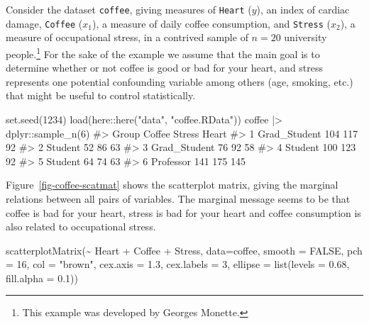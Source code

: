 \documentclass[
  letterpaper,
  10pt,
  krantz2]{krantz}
\makeatletter
\newenvironment{Shaded}{\begin{snugshade}}{\end{snugshade}}
\newcommand{\AttributeTok}[1]{\textcolor[rgb]{0.40,0.45,0.13}{#1}}
\newcommand{\CommentTok}[1]{\textcolor[rgb]{0.37,0.37,0.37}{#1}}
\newcommand{\ConstantTok}[1]{\textcolor[rgb]{0.56,0.35,0.01}{#1}}
\newcommand{\DecValTok}[1]{\textcolor[rgb]{0.68,0.00,0.00}{#1}}
\newcommand{\FloatTok}[1]{\textcolor[rgb]{0.68,0.00,0.00}{#1}}
\newcommand{\FunctionTok}[1]{\textcolor[rgb]{0.28,0.35,0.67}{#1}}
\newcommand{\NormalTok}[1]{\textcolor[rgb]{0.00,0.23,0.31}{#1}}
\newcommand{\SpecialCharTok}[1]{\textcolor[rgb]{0.37,0.37,0.37}{#1}}
\newcommand{\StringTok}[1]{\textcolor[rgb]{0.13,0.47,0.30}{#1}}
\newenvironment{kframe}{%
  \medskip{}
  \setlength{\fboxsep}{.8em}
  \def\at@end@of@kframe{}%
  \ifinner\ifhmode%
  \def\at@end@of@kframe{\end{minipage}}%
  \begin{minipage}{\columnwidth}%
  \fi\fi%
  \def\FrameCommand##1{\hskip\@totalleftmargin \hskip-\fboxsep
  \colorbox{shadecolor}{##1}\hskip-\fboxsep
      \hskip-\linewidth \hskip-\@totalleftmargin \hskip\columnwidth}%
  \MakeFramed {\advance\hsize-\width
    \@totalleftmargin\z@ \linewidth\hsize
    \@setminipage}}%
{\par\unskip\endMakeFramed%
  \at@end@of@kframe}
\renewenvironment{Shaded}{\begin{kframe}}{\end{kframe}}
\makeatother
\begin{document}
Consider the dataset \texttt{coffee}, giving measures of \texttt{Heart}
(\(y\)), an index of cardiac damage, \texttt{Coffee} (\(x_1\)), a
measure of daily coffee consumption, and \texttt{Stress} (\(x_2\)), a
measure of occupational stress, in a contrived sample of \(n=20\)
university people.\footnote{This example was developed by Georges
  Monette.} For the sake of the example we assume that the main goal is
to determine whether or not coffee is good or bad for your heart, and
stress represents one potential confounding variable among others (age,
smoking, etc.) that might be useful to control statistically.

\begin{Shaded}
\begin{Highlighting}[]
\FunctionTok{set.seed}\NormalTok{(}\DecValTok{1234}\NormalTok{)}
\FunctionTok{load}\NormalTok{(here}\SpecialCharTok{::}\FunctionTok{here}\NormalTok{(}\StringTok{"data"}\NormalTok{, }\StringTok{"coffee.RData"}\NormalTok{))}
\NormalTok{coffee }\SpecialCharTok{|\textgreater{}}\NormalTok{ dplyr}\SpecialCharTok{::}\FunctionTok{sample\_n}\NormalTok{(}\DecValTok{6}\NormalTok{)}
\CommentTok{\#\textgreater{}          Group Coffee Stress Heart}
\CommentTok{\#\textgreater{} 1 Grad\_Student    104    117    92}
\CommentTok{\#\textgreater{} 2      Student     52     86    63}
\CommentTok{\#\textgreater{} 3 Grad\_Student     76     92    58}
\CommentTok{\#\textgreater{} 4      Student    100    123    92}
\CommentTok{\#\textgreater{} 5      Student     64     74    63}
\CommentTok{\#\textgreater{} 6    Professor    141    175   145}
\end{Highlighting}
\end{Shaded}

Figure~\ref{fig-coffee-scatmat} shows the scatterplot matrix, giving the
marginal relations between all pairs of variables. The marginal message
seems to be that coffee is bad for your heart, stress is bad for your
heart and coffee consumption is also related to occupational stress.

\begin{Shaded}
\begin{Highlighting}[]
\FunctionTok{scatterplotMatrix}\NormalTok{(}\SpecialCharTok{\textasciitilde{}}\NormalTok{ Heart }\SpecialCharTok{+}\NormalTok{ Coffee }\SpecialCharTok{+}\NormalTok{ Stress, }\AttributeTok{data=}\NormalTok{coffee,}
    \AttributeTok{smooth =} \ConstantTok{FALSE}\NormalTok{,}
    \AttributeTok{pch =} \DecValTok{16}\NormalTok{, }\AttributeTok{col =} \StringTok{"brown"}\NormalTok{,}
    \AttributeTok{cex.axis =} \FloatTok{1.3}\NormalTok{, }\AttributeTok{cex.labels =} \DecValTok{3}\NormalTok{,}
    \AttributeTok{ellipse =} \FunctionTok{list}\NormalTok{(}\AttributeTok{levels =} \FloatTok{0.68}\NormalTok{, }\AttributeTok{fill.alpha =} \FloatTok{0.1}\NormalTok{))}
\end{Highlighting}
\end{Shaded}
\end{document}

